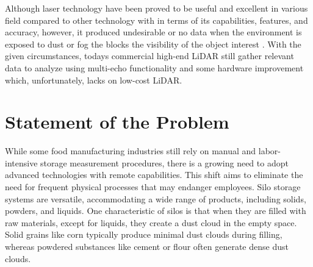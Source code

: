 Although laser  technology have been proved to be useful and excellent in various field compared to other technology with in terms of its capabilities, features, and accuracy, however, it produced undesirable or no data when the environment is exposed to dust or fog the blocks the visibility of the object interest \citep{yigit2015,turner2017,duysak2020}. With the given circumstances, todays commercial high-end LiDAR still gather relevant data to analyze using multi-echo functionality and some hardware improvement which, unfortunately, lacks on low-cost LiDAR.

\section{Statement of the Problem}
\label{intro:sec:Statement of the Problem}

While some food manufacturing industries still rely on manual and labor-intensive storage measurement procedures, there is a growing need to adopt advanced technologies with remote capabilities. This shift aims to eliminate the need for frequent physical processes that may endanger employees. Silo storage systems are versatile, accommodating a wide range of products, including solids, powders, and liquids. One characteristic of silos is that when they are filled with raw materials, except for liquids, they create a dust cloud in the empty space. Solid grains like corn typically produce minimal dust clouds during filling, whereas powdered substances like cement or flour often generate dense dust clouds.

